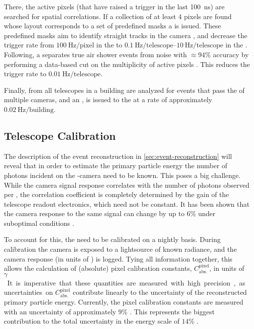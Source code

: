 There, the active pixels (that have raised a trigger in the last 
\SI{100}{\nano\second}) are searched for spatial correlations. If a collection 
of at least 4 pixels are found whose layout corresponds to a set of predefined
masks a \SLT is issued. These predefined masks aim to identify straight tracks 
in the camera \FOV, and decrease the trigger rate from 
$\SI{100}{\hertz\per\mathrm{pixel}}$ in the \FLT to 
$\SIrange[range-units = single]{0.1}{10}{\hertz\per\mathrm{telescope}}$ in the 
\SLT. Following, a \TLT separates true air shower events from noise with 
$\approx94\%$ accuracy by performing a data-based cut on the multiplicity of 
active pixels \cite{abrahamFluorescenceDetectorPierre2010}. This reduces the 
trigger rate to $\SI{0.01}{\hertz\per\mathrm{telescope}}$. 

Finally, \TLTs from all telescopes in a building are analyzed for events that
pass the \FOV of multiple cameras, and an \TTHREE, is issued to the \CDAS at a 
rate of approximately $\SI{0.02}{\hertz\per\mathrm{building}}$.

\subsection{Telescope Calibration}
\label{ssec:fd-calibration}

The description of the event reconstruction in \cref{sec:event-reconstruction}
will reveal that in order to estimate the primary particle energy the number of
photons incident on the \FD-camera need to be known. This poses a big 
challenge. While the camera signal response correlates with the number of 
photons observed per \EAS, the correlation coefficient is completely determined
by the gain of the telescope readout electronics, which need not be constant. 
It has been shown that the camera response to the same signal can change by up 
to $6\%$ under suboptimal conditions \cite{filipJumpsXYCalibration2024}.

To account for this, the \PMTs need to be calibrated on a nightly basis. During
calibration the camera is exposed to a lightsource of known radiance, and the 
camera response (in units of \ADC) is logged. Tying all information together, 
this allows the calculation of (absolute) pixel calibration constants, 
$C^\mathrm{pixel}_\mathrm{abs.}$, in units of \SI{}{$\gamma$\per\ADC}. It is
imperative that these quantities are measured with high precision, as
uncertainties on $C^\mathrm{pixel}_\mathrm{abs.}$ contribute linearly to the 
uncertainty of the reconstructed primary particle energy. Currently, the pixel
calibration constants are measured with an uncertainty of approximately $9\%$
\cite{dawsonUpdateAugerEnergy13}. This represents the biggest contribution to 
the total uncertainty in the \PAO energy scale of $14\%$ 
\cite{verziEnergyScalePierre2013}.

